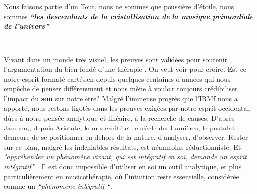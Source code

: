 Nous faisons partie d'un Tout, nous ne sommes que poussière d'étoile,
nous sommes \textit{\textbf{``les descendants de la  cristallisation de la musique primordiale de
l'univers''}} \autocite{delbaz_recherche_2016}




-----------------------------------------------------------------





Vivant dans un monde très visuel, les preuves sont
validées pour soutenir l'argumentation du bien-fondé d'une thérapie
\autocite[ch. II, pp. 105--106 ]{vrait_musicotherapie_2018}. 
      On veut voir pour croire.
Est-ce notre esprit formaté cartésien depuis quelques centaines d'années qui nous 
empêche de penser différemment 
et nous mène à vouloir toujours crédibiliser l'impact 
du \textbf{son} sur notre être?
Malgré l'immense progrès que l'IRMf nous a apporté, nous restons
  ligotés dans les preuves exigées par notre esprit occidental, dûes à
  notre pensée analytique et linéaire, à la recherche de
  causes.
D'après Janssen,\autocite[201]{van_eersel_cerveau}, depuis Aristote, la modernité et le
siècle des Lumières, le postulat demeure de se positionner en dehors
de la nature, d'analyser, d'observer. Rester sur ce plan, malgré les
indéniables résultats, est néanmoins
réductionniste. Et 
\textit{"appréhender un phénomène vivant, qui est intégratif en soi, demande un esprit
  intégratif''} \autocite[201]{van_eersel_cerveau}.
Il est donc impossible d'utiliser en soi un outil analytique, et
plus 
particulièrement en musicothérapie, où l'intuition reste essentielle, 
considérée comme un \textit{``phénomène intégratif ``}.  



